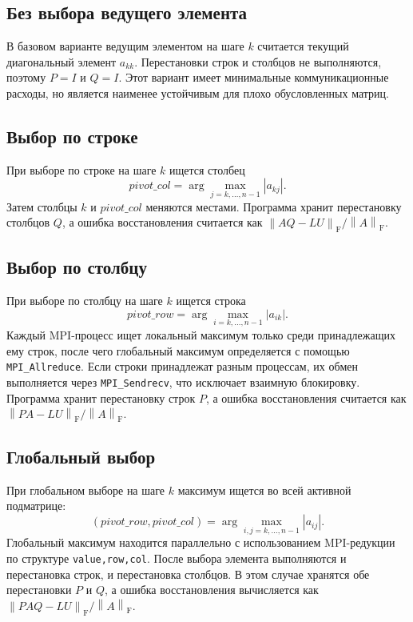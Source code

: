 \documentclass[a4paper,14pt]{extarticle}
\newcommand{\fro}{\mathrm{F}}
\newcommand{\norm}[1]{\left\lVert #1 \right\rVert}
\begin{document}
\subsection{Без выбора ведущего элемента}

В базовом варианте ведущим элементом на шаге $k$ считается текущий диагональный элемент $a_{kk}$. Перестановки строк и столбцов не выполняются, поэтому $P=I$ и $Q=I$. Этот вариант имеет минимальные коммуникационные расходы, но является наименее устойчивым для плохо обусловленных матриц.

\subsection{Выбор по строке}

При выборе по строке на шаге $k$ ищется столбец
\begin{equation}
    pivot\_col = \arg\max_{j=k,\ldots,n-1} |a_{kj}|.
\end{equation}
Затем столбцы $k$ и $pivot\_col$ меняются местами. Программа хранит перестановку столбцов $Q$, а ошибка восстановления считается как $\norm{AQ-LU}_{\fro}/\norm{A}_{\fro}$.

\subsection{Выбор по столбцу}

При выборе по столбцу на шаге $k$ ищется строка
\begin{equation}
    pivot\_row = \arg\max_{i=k,\ldots,n-1} |a_{ik}|.
\end{equation}
Каждый MPI-процесс ищет локальный максимум только среди принадлежащих ему строк, после чего глобальный максимум определяется с помощью \texttt{MPI\_Allreduce}. Если строки принадлежат разным процессам, их обмен выполняется через \texttt{MPI\_Sendrecv}, что исключает взаимную блокировку. Программа хранит перестановку строк $P$, а ошибка восстановления считается как $\norm{PA-LU}_{\fro}/\norm{A}_{\fro}$.

\subsection{Глобальный выбор}

При глобальном выборе на шаге $k$ максимум ищется во всей активной подматрице:
\begin{equation}
    (pivot\_row,pivot\_col) = \arg\max_{i,j=k,\ldots,n-1} |a_{ij}|.
\end{equation}
Глобальный максимум находится параллельно с использованием MPI-редукции по структуре \texttt{value,row,col}. После выбора элемента выполняются и перестановка строк, и перестановка столбцов. В этом случае хранятся обе перестановки $P$ и $Q$, а ошибка восстановления вычисляется как $\norm{PAQ-LU}_{\fro}/\norm{A}_{\fro}$.
\end{document}
